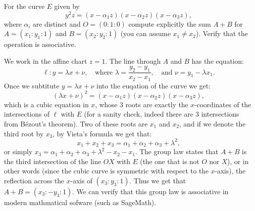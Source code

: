 \documentclass[11pt, a4paper]{article}
\begin{document}
\begin{exercise}
  For the curve $E$ given by
  \[
    y^2 z = (x - \alpha_1 z) (x - \alpha_2 z) (x - \alpha_3 z),
  \]
  where $\alpha_i$ are distinct
  and $O = (0 : 1 : 0)$ compute
  explicitly the sum $A + B$ for $A = (x_1 : y_1 : 1)$ and $B = (x_2 : y_2 : 1)$
  (you can assume $x_1 \neq x_2$).
  Verify that the operation is associative.
\end{exercise}
\begin{solution}
  We work in the affine chart $z = 1$.
  The line through $A$ and $B$ has the equation:
  \[
    \ell \colon y = \lambda x + \nu,
    \quad \text{where }
    \lambda = \frac{y_2 - y_1}{x_2 - x_1},
    \quad \text{and } \nu = y_1 - \lambda x_1.
  \]
  Once we subtitute $y = \lambda x + \nu$ into the euqation of the curve
  we get:
  \[
    (\lambda x + \nu)^2 = (x - \alpha_1 z) (x - \alpha_2 z) (x - \alpha_3 z),
  \]
  which is a cubic equation in $x$, whose $3$ roots are exactly the $x$-coordinates
  of the intersections of $\ell$ with $E$ (for a sanity check, indeed
  there are $3$ intersections from B\'ezout's theorem).
  Two of these roots are $x_1$ and $x_2$,
  and if we denote the third root by $x_3$,
  by Vieta's formula we get that:
  \[
    x_1 + x_2 + x_3 = \alpha_1 + \alpha_2 + \alpha_3 + \lambda^2,
  \]
  or simply $x_3 = \alpha_1 + \alpha_2 + \alpha_3 + \lambda^2 - x_2 - x_1$.
  The group law states that $A + B$ is the third intersection
  of the line $OX$ with $E$ (the one that is not $O$ nor $X$),
  or in other words (since the cubic curve is symmetric with respect to the
  $x$-axis),
  the reflection across the $x$-axis of $(x_3 : y_3 : 1)$.
  Thus we get that $A + B = (x_3 : -y_3 : 1)$.
  We can verify that this group law is associative in modern mathmatical
  sofware (such as SageMath).
\end{solution}
\end{document}
